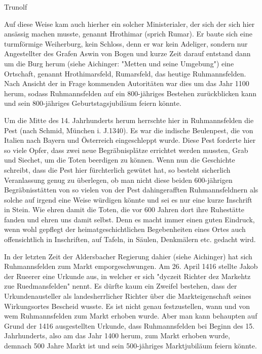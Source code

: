 \documentclass{book}
\begin{document}
Trunolf



Auf diese Weise kam auch hierher ein solcher Ministerialer, der sich der sich
hier ansässig machen musste, genannt Hrothimar (sprich Rumar). Er baute sich
eine turmförmige Weiherburg, kein Schloss, denn er war kein Adeliger, sondern
nur Angestellter des Grafen Aswin von Bogen und kurze Zeit darauf entstand dann
um die Burg herum (siehe Aichinger: "Metten und seine Umgebung") eine Ortschaft,
genannt Hrothimarsfeld, Rumarsfeld, das heutige Ruhmannsfelden. Nach Ansicht der
in Frage kommenden Autoritäten war dies um das Jahr 1100 herum, sodass
Ruhmannsfelden auf ein 800-jähriges Bestehen zurückblicken kann und sein
800-jähriges Geburtstagsjubiläum feiern könnte.

Um die Mitte des 14. Jahrhunderts herum herrschte hier in Ruhmannsfelden die
Pest (nach Schmid, München i. J.1340). Es war die indische Beulenpest, die von
Italien nach Bayern und Österreich eingeschleppt wurde. Diese Pest forderte hier
so viele Opfer, dass zwei neue Begräbnisplätze errichtet werden mussten, Grab
und Siechet, um die Toten beerdigen zu können. Wenn nun die Geschichte schreibt,
dass die Pest hier fürchterlich gewütet hat, so besteht sicherlich Veranlassung
genug zu überlegen, ob man nicht diese beiden 600-jährigen Begräbnisstätten von
so vielen von der Pest dahingerafften Ruhmannsfeldnern als solche auf irgend
eine Weise würdigen könnte und sei es nur eine kurze Inschrift in Stein. Wie
ehren damit die Toten, die vor 600 Jahren dort ihre Ruhestätte fanden und ehren
uns damit selbst. Denn es macht immer einen guten Eindruck, wenn wohl gepflegt
der heimatgeschichtlichen Begebenheiten eines Ortes auch offensichtlich in
Inschriften, auf Tafeln, in Säulen, Denkmälern etc. gedacht wird.

In der letzten Zeit der Aldersbacher Regierung dahier (siehe Aichinger) hat sich
Ruhmannsfelden zum Markt emporgeschwungen. Am 26. April 1416 stellte Jakob der
Rueerer eine Urkunde aus, in welcher er sich "dyczeit Richter dez Markehtz zue
Ruedmansfelden" nennt. Es dürfte kaum ein Zweifel bestehen, dass der
Urkundenausteller als landesherrlicher Richter über die Markteigenschaft seines
Wirkungsortes Bescheid wusste. Es ist nicht genau festzustellen, wann und von
wem Ruhmannsfelden zum Markt erhoben wurde. Aber man kann behaupten auf Grund
der 1416 ausgestellten Urkunde, dass Ruhmannsfelden bei Beginn des 15.
Jahrhunderts, also am das Jahr 1400 herum, zum Markt erhoben wurde, demnach 500
Jahre Markt ist und sein 500-jähriges Marktjubiläum feiern könnte.
\end{document}
